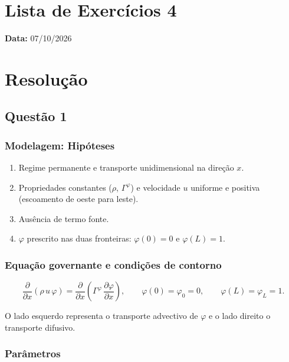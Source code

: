 \section*{Lista de Exercícios 4}

\noindent \textbf{Data:} 07/10/2026

\section*{Resolução}
\subsection*{Questão 1}

\subsubsection*{Modelagem: Hipóteses}

\begin{enumerate}
  \item Regime permanente e transporte unidimensional na direção $x$.
  \item Propriedades constantes ($\rho$, $\Gamma^{\varphi}$) e velocidade $u$
        uniforme e positiva (escoamento de oeste para leste).
  \item Ausência de termo fonte.
  \item $\varphi$ prescrito nas duas fronteiras: $\varphi(0)=0$ e
        $\varphi(L)=1$.
\end{enumerate}

\subsubsection*{Equação governante e condições de contorno}

\begin{equation}
  \frac{\partial}{\partial x}\left(\rho\,u\,\varphi\right)
  =\frac{\partial}{\partial x}\!\left(\Gamma^{\varphi}\,
  \frac{\partial \varphi}{\partial x}\right),
  \qquad
  \varphi(0)=\varphi_0=0,\qquad \varphi(L)=\varphi_L=1 .
  \label{eq:advdif}
\end{equation}

O lado esquerdo representa o transporte advectivo de $\varphi$ e o lado
direito o transporte difusivo.

\subsubsection*{Parâmetros}

